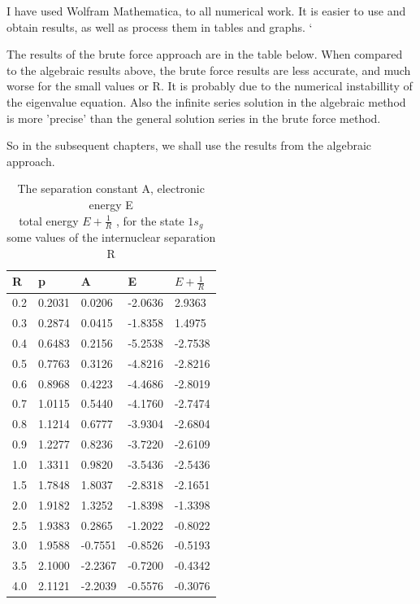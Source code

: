 I have used Wolfram Mathematica, to all numerical work. It is easier to use and obtain results, as well as process them in tables and graphs. `

The results of the brute force approach are in the table below. When compared to the algebraic results above, the brute force results are less accurate, and much worse for the small values or R.  It is probably due to the numerical instabillity of the eigenvalue equation. Also the infinite series solution in the algebraic method is more 'precise' than the general solution series in the brute force method.

So in the subsequent chapters, we shall use the results from the algebraic approach.

\begin{table}[ht]
{ 
 \caption{ The separation constant A, electronic energy E \\ total energy $ E + \frac{1}{R} $ , for the state $ 1s_g $ some values of the internuclear separation R \\[1.1em] }
		\begin{tabular}{ m{6em} m{6em}  m{6em}  m{6em} m{6em} }
		\hline
		    R & p & A & E & $ E + \frac{1}{R} $ \\ \hline \hline
        0.2 & 0.2031 & 0.0206 & -2.0636 & 2.9363 \\
        0.3 & 0.2874 & 0.0415 & -1.8358 & 1.4975 \\
        0.4 & 0.6483 & 0.2156 & -5.2538 & -2.7538 \\
        0.5 & 0.7763 & 0.3126 & -4.8216 & -2.8216 \\
        0.6 & 0.8968 & 0.4223 & -4.4686 & -2.8019 \\
        0.7 & 1.0115 & 0.5440 & -4.1760 & -2.7474 \\
        0.8 & 1.1214 & 0.6777 & -3.9304 & -2.6804 \\
        0.9 & 1.2277 & 0.8236 & -3.7220 & -2.6109 \\
        1.0 & 1.3311 & 0.9820 & -3.5436 & -2.5436 \\
        1.5 & 1.7848 & 1.8037 & -2.8318 & -2.1651 \\
        2.0 & 1.9182 & 1.3252 & -1.8398 & -1.3398 \\
        2.5 & 1.9383 & 0.2865 & -1.2022 & -0.8022 \\
        3.0 & 1.9588 & -0.7551 & -0.8526 & -0.5193 \\
        3.5 & 2.1000 & -2.2367 & -0.7200 & -0.4342 \\
        4.0 & 2.1121 & -2.2039 & -0.5576 & -0.3076 \\

\end{tabular}}
\end{table}
